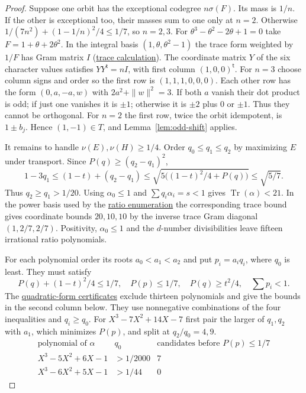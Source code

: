 \documentclass[11pt,reqno]{amsart}
\newcommand{\codecheck}[2]{\href{https://github.com/sebastienpalcoux/grothendieck-ring-classification/blob/d5750105bb5758f3ad38d2e5464dfcc12c019816/supplements/rank6/sphericality/#1}{#2}}
\theoremstyle{remark}\newtheorem{remark}[theorem]{Remark}
\numberwithin{equation}{section}
\begin{document}
\begin{proof}
Suppose one orbit has the exceptional codegree $n\sigma(F)$. Its mass
is $1/n$. If the other is exceptional too, their masses sum to one
only at $n=2$. Otherwise $1/(7n^2)+(1-1/n)^2/4\le1/7$, so $n=2,3$.
For $\theta^3-\theta^2-2\theta+1=0$ take $F=1+\theta+2\theta^2$.
In the integral basis $(1,\theta,\theta^2-1)$ the trace form
weighted by $1/F$ has Gram matrix $I$
(\codecheck{odd_degree_checks/cubic_seven_lattice_check.py}{trace calculation}).
The coordinate matrix $Y$ of the six character values satisfies
$YY^{\mathsf t}=nI$, with first column $(1,0,0)^{\mathsf t}$.
For $n=3$ choose column signs and order so the first row is
$(1,1,1,0,0,0)$. Each other row has the form $(0,a,-a,w)$ with
$2a^2+\|w\|^2=3$. If both $a$ vanish their dot product is odd;
if just one vanishes it is $\pm1$; otherwise it is $\pm2$ plus
$0$ or $\pm1$. Thus they cannot be orthogonal. For $n=2$ the first
row, twice the orbit idempotent, is $1\pm b_j$. Hence
$(1,-1)\in T$, and Lemma~\ref{lem:odd-shift} applies.

It remains to handle $\nu(E),\nu(H)\ge1/4$. Order
$q_0\le q_1\le q_2$ by maximizing $E$ under transport. Since $P(q)\ge(q_2-q_1)^2$,
\[
 1-3q_1\le(1-t)+(q_2-q_1)
 \le\sqrt{5\big((1-t)^2/4+P(q)\big)}\le\sqrt{5/7}.
\]
Thus $q_2\ge q_1>1/20$. Using $\alpha_0\le1$ and
$\sum q_i\alpha_i=s<1$ gives $\operatorname{Tr}(\alpha)<21$.
In the power basis used by the
\codecheck{odd_degree_checks/cubic_ratio_bound.py}{ratio enumeration}
the corresponding trace bound gives coordinate bounds $20,10,10$
by the inverse trace Gram diagonal $(1,2/7,2/7)$. Positivity,
$\alpha_0\le1$ and the $d$-number divisibilities leave fifteen
irrational ratio polynomials.

For each polynomial order its roots $a_0<a_1<a_2$ and put $p_i=a_iq_i$,
where $q_0$ is least. They must satisfy
\[
 P(q)+(1-t)^2/4\le1/7,\quad P(p)\le1/7,\quad
 P(q)\ge t^2/4,\quad \textstyle\sum p_i<1.
\]
The \codecheck{odd_degree_checks/cubic_ratio_fourier.py}{quadratic-form certificates}
exclude thirteen polynomials and give the bounds in the second column
below. They use nonnegative combinations of the four inequalities and
$q_i\ge q_0$. For $X^3-7X^2+14X-7$ first pair the larger of $q_1,q_2$
with $a_1$, which minimizes $P(p)$, and split at $q_2/q_0=4,9$.
\[
 \begin{array}{c|c|c}
 \text{polynomial of }\alpha&q_0&\text{candidates before }P(p)\le1/7\\\hline
 X^3-5X^2+6X-1&>1/2000&7\\
 X^3-6X^2+5X-1&>1/44&0
 \end{array}
\]


\end{proof}
\end{document}
